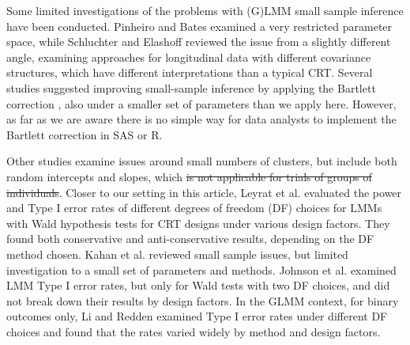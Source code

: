 \documentclass[twocolumn]{bmcart}%
\providecommand{\DIFaddtex}[1]{{\protect\color{blue}\uwave{#1}}} %
\providecommand{\DIFdeltex}[1]{{\protect\color{red}\sout{#1}}}                      %
\providecommand{\DIFaddbegin}{} %
\providecommand{\DIFaddend}{} %
\providecommand{\DIFdelbegin}{} %
\providecommand{\DIFdelend}{} %
\providecommand{\DIFadd}[1]{\texorpdfstring{\DIFaddtex{#1}}{#1}} %
\providecommand{\DIFdel}[1]{\texorpdfstring{\DIFdeltex{#1}}{}} %
\begin{document}
Some limited investigations of the problems with (G)LMM small sample inference have been conducted. Pinheiro and Bates \cite{pinheiro_mixed-effects_2009} examined a very restricted parameter space, while Schluchter and Elashoff \cite{schluchter_small-sample_1990} reviewed the issue from a slightly different angle, examining approaches for longitudinal data with different covariance structures, which have different interpretations than a typical CRT. Several studies \cite{zucker_improved_2000, melo_improved_2009, manor_small_2004, stein_alternatives_2014} suggested improving small-sample inference by applying the Bartlett correction \cite{bartlett_properties_1937}, also under a smaller set of parameters than we apply here. However, as far as we are aware there is no simple way for data analysts to implement the Bartlett correction in SAS or R.  

Other studies \cite{luke_evaluating_2017, maas_sufficient_2005, bell_dancing_2010} examine issues around small numbers of clusters, but include both random intercepts and slopes, which \DIFdelbegin \DIFdel{is not applicable for trials of groups of individuals}\DIFdelend \DIFaddbegin \DIFadd{may not be a structure that all CRTs utilize}\DIFaddend . Closer to our setting in this article, Leyrat et al. \cite{leyrat_cluster_2018} evaluated the power and Type I error rates of different degrees of freedom (DF) choices for LMMs with Wald hypothesis tests for CRT designs under various design factors. They found both conservative and anti-conservative results, depending on the DF method chosen. Kahan et al. \cite{kahan_increased_2016} reviewed small sample issues, but limited investigation to a small set of parameters and methods. Johnson et al. \cite{johnson_recommendations_2015} examined LMM Type I error rates, but only for Wald tests with two DF choices, and did not break down their results by design factors. In the GLMM context, for binary outcomes only, Li and Redden \cite{li_comparing_2015} examined Type I error rates under different DF choices and found that the rates varied widely by method and design factors.
\end{document}
